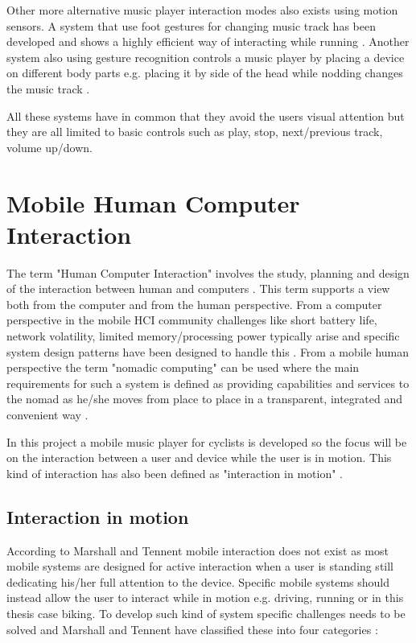 Other more alternative music player interaction modes also exists using motion sensors. A system that use foot gestures for changing music track has been developed and shows a highly efficient way of interacting while running \cite{smus_running_2010}. Another system also using gesture recognition controls a music player by placing a device on different body parts e.g. placing it by side of the head while nodding changes the music track \cite{strachan_bodyspace_2007}. 

All these systems have in common that they avoid the users visual attention but they are all limited to basic controls such as play, stop, next/previous track, volume up/down.


\section{Mobile Human Computer Interaction}
The term "Human Computer Interaction" involves the study, planning and design of the interaction between human and computers \cite{card_psychology_1983}. This term supports a view both from the computer and from the human perspective. From a computer perspective in the mobile HCI community challenges like short battery life, network volatility, limited memory/processing power typically arise and specific system design patterns have been designed to handle this \cite{roth_patterns_2002}. From a mobile human perspective the term "nomadic computing" can be used where the main requirements for such a system is defined as providing capabilities and services to the nomad as he/she moves from place to place in a transparent, integrated and convenient way \cite{sawhney_nomadic_2000}.

In this project a mobile music player for cyclists is developed so the focus will be on the interaction between a user and device while the user is in motion. This kind of interaction has also been defined as "interaction in motion" \cite{marshall_mobile_2013}.

\subsection{Interaction in motion}
\label{sec:interactioninmotion}
According to Marshall and Tennent \cite{marshall_mobile_2013} mobile interaction does not exist as most mobile systems are designed for active interaction when a user is standing still dedicating his/her full attention to the device. Specific mobile systems should instead allow the user to interact while in motion e.g. driving, running or in this thesis case biking. To develop such kind of system specific challenges needs to be solved and Marshall and Tennent have classified these into four categories \cite{marshall_mobile_2013}:

